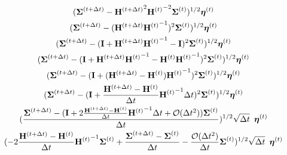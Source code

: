 \documentclass[12pt,]{article}
\begin{document}
\begin{gather}
    (\boldsymbol{\Sigma}^{(t + \Delta t)} -  {\mathbf{H}^{(t+\Delta t)}}^{\hspace{-0mm} 2} {\mathbf{H}^{(t)}}^{\hspace{0mm}-2} \boldsymbol{\Sigma}^{(t)} )^{1/2} \boldsymbol{\eta}^{(t)}  \\
    (\boldsymbol{\Sigma}^{(t + \Delta t)} - ( {\mathbf{H}^{(t+\Delta t)}} {\mathbf{H}^{(t)}}^{\hspace{0mm}-1})^2 \boldsymbol{\Sigma}^{(t)} )^{1/2} \boldsymbol{\eta}^{(t)}  \\
    (\boldsymbol{\Sigma}^{(t + \Delta t)} - (\mathbf{I} +  {\mathbf{H}^{(t+\Delta t)}}{\mathbf{H}^{(t)}}^{\hspace{0mm}-1} - \mathbf{I})^{2} \boldsymbol{\Sigma}^{(t)} )^{1/2} \boldsymbol{\eta}^{(t)}  \\
    (\boldsymbol{\Sigma}^{(t + \Delta t)} - (\mathbf{I} +  {\mathbf{H}^{(t+\Delta t)}}{\mathbf{H}^{(t)}}^{\hspace{0mm}-1} -  {\mathbf{H}^{(t)}}{\mathbf{H}^{(t)}}^{\hspace{0mm}-1})^{2} \boldsymbol{\Sigma}^{(t)} )^{1/2} \boldsymbol{\eta}^{(t)}  \\
    (\boldsymbol{\Sigma}^{(t + \Delta t)} - (\mathbf{I} +  ({\mathbf{H}^{(t+\Delta t)}} -  {\mathbf{H}^{(t)}}) {\mathbf{H}^{(t)}}^{\hspace{0mm}-1})^{2} \boldsymbol{\Sigma}^{(t)} )^{1/2} \boldsymbol{\eta}^{(t)}  \\
    (\boldsymbol{\Sigma}^{(t + \Delta t)} - (\mathbf{I} +  \frac{{\mathbf{H}^{(t+\Delta t)}} -  {\mathbf{H}^{(t)}}}{\Delta t} {\mathbf{H}^{(t)}}^{\hspace{0mm}-1} \Delta t)^{2} \boldsymbol{\Sigma}^{(t)} )^{1/2} 
    \boldsymbol{\eta}^{(t)} \\
    (\frac{\boldsymbol{\Sigma}^{(t + \Delta t)} - (\mathbf{I} + 
    2\frac{\mathbf{H}^{(t+\Delta t)} -  {\mathbf{H}^{(t)}}}{\Delta t} {\mathbf{H}^{(t)}}^{\hspace{0mm}-1} \Delta t + \mathcal{O}(\Delta t^2)) \boldsymbol{\Sigma}^{(t)}}{\Delta t} )^{1/2}
     \sqrt{\Delta t} \enspace \boldsymbol{\eta}^{(t)} \\
    (-  2 \frac{{\mathbf{H}^{(t+\Delta t)}} -  {\mathbf{H}^{(t)}}}{\Delta t} {\mathbf{H}^{(t)}}^{\hspace{0mm}-1}  \boldsymbol{\Sigma}^{(t)} + \frac{\boldsymbol{\Sigma}^{(t + \Delta t)} - \boldsymbol{\Sigma}^{(t)}}{\Delta t}  - \frac{\mathcal{O}(\Delta t^2)}{\Delta t} \boldsymbol{\Sigma}^{(t)}  )^{1/2} \sqrt{\Delta t} \enspace \boldsymbol{\eta}^{(t)} \label{eq:second_term}
\end{gather}
\end{document}
